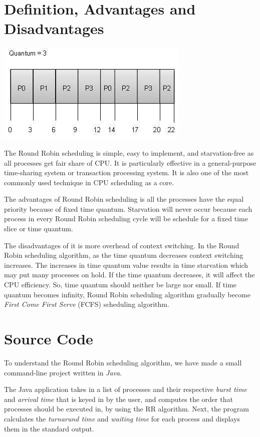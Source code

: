 \documentclass[12pt]{article}
\begin{document}
 \newpage 
 \section{Definition, Advantages and Disadvantages}

 \includegraphics[scale = 0.5]{round_robin.jpg}

The Round Robin scheduling is simple, easy to implement, and starvation-free as
all processes get fair share of CPU. It is particularly effective in a
general-purpose time-sharing system or transaction processing system. It is also
one of the most commonly used technique in CPU scheduling as a core.

The advantages of Round Robin scheduling is all the processes have the equal
priority because of fixed time quantum. Starvation will never occur because each
process in every Round Robin scheduling cycle will be schedule for a fixed time
slice or time quantum.

The disadvantages of it is more overhead of context switching. In the Round
Robin scheduling algorithm, as the time quantum decreases context switching
increases. The increases in time quantum value results in time starvation which
may put many processes on hold. If the time quantum decreases, it will affect
the CPU efficiency. So, time quantum should neither be large nor small. If time
quantum becomes infinity, Round Robin scheduling algorithm gradually become
\textit{First Come First Serve} (FCFS) scheduling algorithm.

\newpage
\section{Source Code}

To understand the Round Robin scheduling algorithm, we have made a small
command-line project written in \textit{Java}.

The Java application takes in a list of processes and their respective
\textit{burst time} and \textit{arrival time} that is keyed in by the user, and
computes the order that processes should be executed in, by using the RR
algorithm. Next, the program calculates the \textit{turnarund time} and
\textit{waiting time} for each process and displays them in the standard output.
\end{document}
